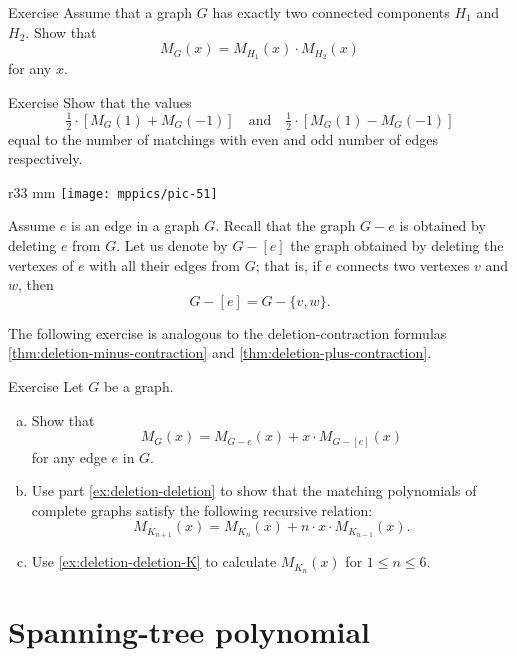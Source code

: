 \begin{thm}{Exercise}
Assume that a graph $G$ has exactly two connected components $H_1$ and $H_2$.
Show that 
\[M_G(x)=M_{H_1}(x)\cdot M_{H_2}(x)\]
for any $x$.
\end{thm}

\begin{thm}{Exercise}
Show that the values
\[\tfrac12\cdot[M_G(1)+ M_G(-1)]\quad\text{and}\quad\tfrac12\cdot[M_G(1)- M_G(-1)]\]
equal to the number of matchings with even and odd number of edges respectively.
\end{thm}

{

\begin{wrapfigure}{r}{33 mm}
\vskip-8mm
\centering
\texttt{[image: mppics/pic-51]}
\vskip-0mm
\end{wrapfigure}

Assume $e$ is an edge in a graph $G$.
Recall that the graph $G- e$ is obtained by deleting $e$ from $G$.
Let us denote by $G- [e]$ the graph obtained by deleting the vertexes of $e$ with all their edges from $G$;
that is, if $e$ connects two vertexes $v$ and $w$, then 
\[G- [e]=G- \{v,w\}.\]

}

The following exercise is analogous to the deletion-contraction formulas \ref{thm:deletion-minus-contraction} and \ref{thm:deletion-plus-contraction}.

\begin{thm}{Exercise}\label{ex:deletion-deletion-total}
Let $G$ be a graph.
\begin{enumerate}[(a)]
\item\label{ex:deletion-deletion} Show that
\[M_G(x)=M_{G- e}(x)+x\cdot M_{G- [e]}(x)\]
for any edge $e$ in $G$.

\item\label{ex:deletion-deletion-K} Use part \ref{ex:deletion-deletion} to show that the matching polynomials of complete graphs satisfy the following recursive relation:
\[M_{K_{n+1}}(x)=M_{K_{n}}(x)+n\cdot x\cdot M_{K_{n-1}}(x).\]

\item Use \ref{ex:deletion-deletion-K} to calculate $M_{K_n}(x)$ for $1\le n\le 6$.
\end{enumerate}

\end{thm}

\section*{Spanning-tree polynomial}

